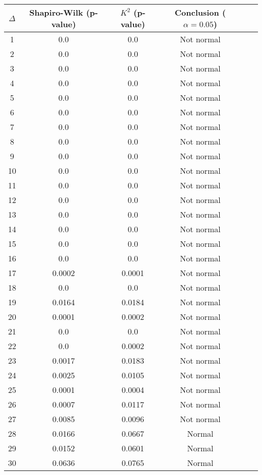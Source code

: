 \begin{table}[h]
	\begin{tabular}{|c|c|c|c|c|c|}
		\hline
		$\Delta$ & Shapiro-Wilk (p-value) & $K^2$ (p-value) & Conclusion ($\alpha = 0.05$)\\\hline
		\hline
		1 & 0.0 & 0.0 & Not normal\\\hline
		2 & 0.0 & 0.0 & Not normal\\\hline
		3 & 0.0 & 0.0 & Not normal\\\hline
		4 & 0.0 & 0.0 & Not normal\\\hline
		5 & 0.0 & 0.0 & Not normal\\\hline
		6 & 0.0 & 0.0 & Not normal\\\hline
		7 & 0.0 & 0.0 & Not normal\\\hline
		8 & 0.0 & 0.0 & Not normal\\\hline
		9 & 0.0 & 0.0 & Not normal\\\hline
		10 & 0.0 & 0.0 & Not normal\\\hline
		11 & 0.0 & 0.0 & Not normal\\\hline
		12 & 0.0 & 0.0 & Not normal\\\hline
		13 & 0.0 & 0.0 & Not normal\\\hline
		14 & 0.0 & 0.0 & Not normal\\\hline
		15 & 0.0 & 0.0 & Not normal\\\hline
		16 & 0.0 & 0.0 & Not normal\\\hline
		17 & 0.0002 & 0.0001 & Not normal\\\hline
		18 & 0.0 & 0.0 & Not normal\\\hline
		19 & 0.0164 & 0.0184 & Not normal\\\hline
		20 & 0.0001 & 0.0002 & Not normal\\\hline
		21 & 0.0 & 0.0 & Not normal\\\hline
		22 & 0.0 & 0.0002 & Not normal\\\hline
		23 & 0.0017 & 0.0183 & Not normal\\\hline
		24 & 0.0025 & 0.0105 & Not normal\\\hline
		25 & 0.0001 & 0.0004 & Not normal\\\hline
		26 & 0.0007 & 0.0117 & Not normal\\\hline
		27 & 0.0085 & 0.0096 & Not normal\\\hline
		28 & 0.0166 & 0.0667 & Normal\\\hline
		29 & 0.0152 & 0.0601 & Normal\\\hline
		30 & 0.0636 & 0.0765 & Normal\\\hline

\end{tabular}
\end{table}
